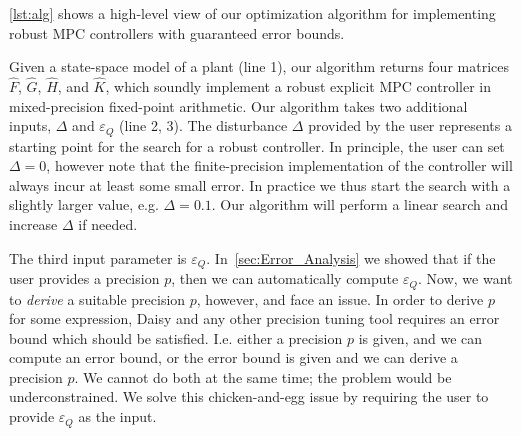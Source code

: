 \autoref{lst:alg} shows a high-level view of our optimization algorithm for
implementing robust MPC controllers with guaranteed error bounds.

Given a state-space model of a plant (line 1), our algorithm returns four matrices
$\hat{F}$, $\hat{G}$, $\hat{H}$, and $\hat{K}$,
which soundly implement a robust explicit MPC controller in mixed-precision
fixed-point arithmetic.
Our algorithm takes two additional inputs, $\Delta$ and $\varepsilon_Q$ (line 2, 3). 
The disturbance $\Delta$ provided by the user represents a starting point for 
the search for a robust controller. In principle, the user can set $\Delta = 0$,
however note that the finite-precision implementation of the controller will always
incur at least some small error. In practice we thus start the search with a slightly
larger value, e.g. $\Delta = 0.1$. Our algorithm will perform a linear search and
increase $\Delta$ if needed.

The third input parameter is $\varepsilon_Q$. In~\autoref{sec:Error_Analysis} we
showed that if the user provides a precision $p$, then we can automatically
compute $\varepsilon_Q$.
Now, we want to \emph{derive} a suitable precision $p$, however, and face an
issue. In order to derive $p$ for some expression, Daisy and any other precision
tuning tool requires an error bound which should be satisfied. I.e. either a
precision $p$ is given, and we can compute an error bound, or the error bound is
given and we can derive a precision $p$. We cannot do both at the same time; the
problem would be underconstrained. We solve this chicken-and-egg issue by
requiring the user to provide $\varepsilon_Q$ as the input. 

